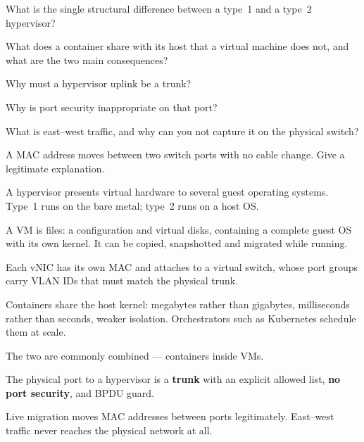 \begin{checkpoint}
\begin{tightnum}
  \item What is the single structural difference between a type~1 and a type~2
        hypervisor?
  \item What does a container share with its host that a virtual machine does
        not, and what are the two main consequences?
  \item Why must a hypervisor uplink be a trunk?
  \item Why is port security inappropriate on that port?
  \item What is east--west traffic, and why can you not capture it on the
        physical switch?
  \item A MAC address moves between two switch ports with no cable change. Give a
        legitimate explanation.
\end{tightnum}
\end{checkpoint}

\begin{chaptersummary}
\begin{tight}
  \item A hypervisor presents virtual hardware to several guest operating
        systems. Type~1 runs on the bare metal; type~2 runs on a host OS.
  \item A VM is files: a configuration and virtual disks, containing a complete
        guest OS with its own kernel. It can be copied, snapshotted and migrated
        while running.
  \item Each vNIC has its own MAC and attaches to a virtual switch, whose port
        groups carry VLAN IDs that must match the physical trunk.
  \item Containers share the host kernel: megabytes rather than gigabytes,
        milliseconds rather than seconds, weaker isolation. Orchestrators such as
        Kubernetes schedule them at scale.
  \item The two are commonly combined --- containers inside VMs.
  \item The physical port to a hypervisor is a \textbf{trunk} with an explicit
        allowed list, \textbf{no port security},  and BPDU
        guard.
  \item Live migration moves MAC addresses between ports legitimately. East--west
        traffic never reaches the physical network at all.
\end{tight}
\end{chaptersummary}

